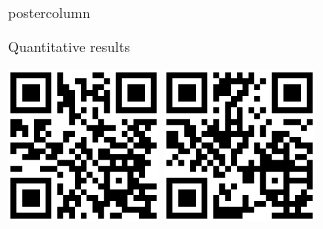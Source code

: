 \documentclass[final,hyperref={pdfpagelabels=false}]{beamer}
\newlength{\columnheight}
\begin{document}
\begin{frame}[t]
{\begin{minipage}[t][\columnheight][c]{0.95\textwidth}
{\begin{columns}[T,totalwidth=\textwidth]
\begin{column}{.34\textwidth}
\begin{beamercolorbox}[center,wd=\textwidth]{postercolumn}
\begin{minipage}[T]{\textwidth}
{            %
            \vfill            
            \begin{block}{Quantitative results}
            \noindent\makebox[\textwidth][c]{%
            \begin{minipage}[T][][c]{.75\textwidth} 
            
            
            \end{minipage}
            }
            \end{block}
            \vfill
            \begin{alertblock}{}
            \begin{minipage}[T]{\textwidth}
            \noindent
            \includegraphics[height=4cm]{logos/qrcode-github}\hfill
            \includegraphics[height=4cm]{logos/qrcode-paper}
            \end{minipage}
            \end{alertblock}
          }
        \end{minipage}
      \end{beamercolorbox}
    \end{column}


\end{columns}}
\end{minipage}}
\end{frame}
\end{document}
